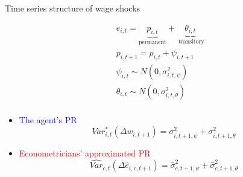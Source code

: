 \documentclass{beamer}
\begin{document}
\begin{frame}{Time series structure of wage shocks}
	
	\begin{equation*}
		\begin{split}
			& e_{i,t} = \underbrace{p_{i,t}}_{\text{permanent}} + \underbrace{\theta_{i,t}}_{\text{ transitory}} \\
			& p_{i,t+1} = p_{i,t} + \psi_{i,t+1} \\
			& \psi_{i,t} \sim N(0,\sigma^2_{i,t,\psi}) \\
			& \theta_{i,t} \sim N(0,\sigma^2_{i,t,\theta}) \\
		\end{split} 
	\end{equation*}
	\pause 
	\begin{itemize}
		\item \textcolor{blue}{The agent's PR}
		\begin{equation*}
			Var^*_{i,t}(\Delta w_{i,t+1}) = \sigma^2_{i,t+1,\psi} + \sigma^2_{i,t+1,\theta}		\end{equation*}
		\pause 
		\item \textcolor{red}{Econometricians' approximated PR}
		\begin{equation*}
			\widehat {Var}_{c,t}(\Delta \hat e_{i,c,t+1})     =  \hat \sigma^2_{c,t+1,\psi} + \hat \sigma^2_{c,t+1,\theta} 
		\end{equation*}
	\end{itemize}
\end{frame}
\end{document}
